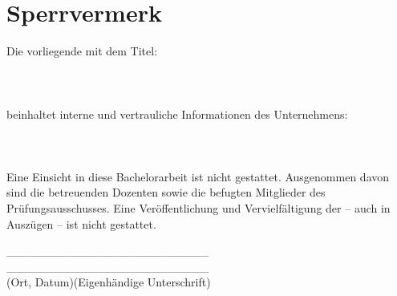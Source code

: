 \newpage
\thispagestyle{empty}

\section*{Sperrvermerk}
Die vorliegende \dcsubject{} mit dem Titel: \\

\glqq\dctitle\grqq{} \\ \\ \\

beinhaltet interne und vertrauliche Informationen des Unternehmens: \\

\dccompany \\ \\ \\

Eine Einsicht in diese Bachelorarbeit ist nicht gestattet. Ausgenommen davon sind die betreuenden Dozenten sowie die befugten Mitglieder des Prüfungsausschusses. Eine Veröffentlichung und Vervielfältigung der \dcsubject{} – auch in Auszügen – ist nicht gestattet. \\

\par\medskip
\par\medskip


\_\_\_\_\_\_\_\_\_\_\_\_\_\_\_\_\_\_\_\_\_\_\_\_ \hspace{1.5cm} \_\_\_\_\_\_\_\_\_\_\_\_\_\_\_\_\_\_\_\_\_\_\_\_ \\
(Ort, Datum)\hspace{4.9cm}(Eigenhändige Unterschrift)

\newpage